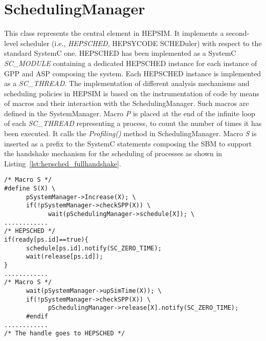 \section{SchedulingManager}
%
This class represents the central element in HEPSIM. It implements a second-level scheduler (i.e., \textit{HEPSCHED}, HEPSYCODE SCHEDuler) with respect to the standard SystemC one. HEPSCHED has been implemented as a SystemC \textit{SC\_MODULE} containing a dedicated HEPSCHED instance for each instance of GPP and ASP composing the system. Each HEPSCHED instance is implemented as a \textit{SC\_THREAD}. The implementation of different analysis mechanisms and scheduling policies in HEPSIM is based on the instrumentation of code by means of macros and their interaction with the SchedulingManager.
Such macros are defined in the SystemManager. Macro \textit{P} is placed at the end of the infinite loop of each \textit{SC\_THREAD} representing a process, to count the number of times it has been executed. It calls the \textit{Profiling()} method in SchedulingManager. Macro \textit{S} is inserted as a prefix to the SystemC statements composing the SBM to support the handshake mechanism for the scheduling of processes as shown in Listing~\ref{lst:hepsched_fullhandshake}.  
%
\lstset{language=C++,basicstyle=\footnotesize}
\begin{lstlisting}[caption={HEPSCHED Full Handshake: Interactions with macro S},label=lst:hepsched_fullhandshake]
/* Macro S */
#define S(X) \
      pSystemManager->Increase(X); \
      if(!pSystemManager->checkSPP(X)) \
            wait(pSchedulingManager->schedule[X]); \
............
/* HEPSCHED */
if(ready[ps.id]==true){
      schedule[ps.id].notify(SC_ZERO_TIME);
      wait(release[ps.id]);
}
............
/* Macro S */
      wait(pSystemManager->upSimTime(X)); \
      if(!pSystemManager->checkSPP(X)) \
            pSchedulingManager->release[X].notify(SC_ZERO_TIME);
      #endif
............
/* The handle goes to HEPSCHED */
\end{lstlisting}
%
